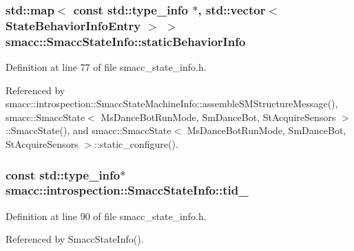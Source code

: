 \subsubsection[{\texorpdfstring{static\+Behavior\+Info}{staticBehaviorInfo}}]{\setlength{\rightskip}{0pt plus 5cm}std\+::map$<$ const std\+::type\+\_\+info $\ast$, std\+::vector$<$ {\bf State\+Behavior\+Info\+Entry} $>$ $>$ smacc\+::\+Smacc\+State\+Info\+::static\+Behavior\+Info\hspace{0.3cm}{\ttfamily [static]}}\hypertarget{classsmacc_1_1introspection_1_1SmaccStateInfo_a2cc62c6c9dec1a4f5294f8430efb71f2}{}\label{classsmacc_1_1introspection_1_1SmaccStateInfo_a2cc62c6c9dec1a4f5294f8430efb71f2}


Definition at line 77 of file smacc\+\_\+state\+\_\+info.\+h.



Referenced by smacc\+::introspection\+::\+Smacc\+State\+Machine\+Info\+::assemble\+S\+M\+Structure\+Message(), smacc\+::\+Smacc\+State$<$ Ms\+Dance\+Bot\+Run\+Mode, Sm\+Dance\+Bot, St\+Acquire\+Sensors $>$\+::\+Smacc\+State(), and smacc\+::\+Smacc\+State$<$ Ms\+Dance\+Bot\+Run\+Mode, Sm\+Dance\+Bot, St\+Acquire\+Sensors $>$\+::static\+\_\+configure().

\subsubsection[{\texorpdfstring{tid\+\_\+}{tid_}}]{\setlength{\rightskip}{0pt plus 5cm}const std\+::type\+\_\+info$\ast$ smacc\+::introspection\+::\+Smacc\+State\+Info\+::tid\+\_\+}\hypertarget{classsmacc_1_1introspection_1_1SmaccStateInfo_a37d0d0bce171b57b8d3a39f44ab45248}{}\label{classsmacc_1_1introspection_1_1SmaccStateInfo_a37d0d0bce171b57b8d3a39f44ab45248}


Definition at line 90 of file smacc\+\_\+state\+\_\+info.\+h.



Referenced by Smacc\+State\+Info().

